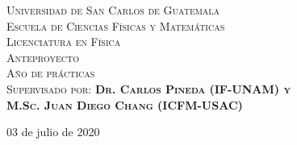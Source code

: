 \documentclass[11pt, spanish, letterpage]{article} %
\begin{document}
\begin{titlepage}
\textsc{\LARGE Universidad de San Carlos de Guatemala\\ Escuela de Ciencias Físicas y Matemáticas\\ Licenciatura en Física}\\[2cm]

\textsc{\huge Anteproyecto}\\
\textsc{\Large Año de prácticas}\\[2cm]

\textsc{\Large Supervisado por: \textbf{Dr. Carlos Pineda (IF-UNAM) y\\M.Sc. Juan Diego Chang (ICFM-USAC)}}
                                                                                                      

\vfill\vfill\vfill %
\vfill\vfill\vfill

{\large 03 de julio de 2020} %




\vfill %

\end{titlepage} %
\end{document}
